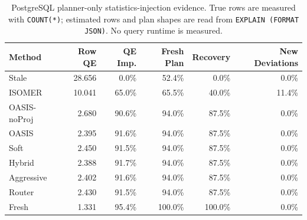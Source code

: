 \begin{table}[t]
  \centering
  \small
  \caption{PostgreSQL planner-only statistics-injection evidence. True rows are measured with \texttt{COUNT(*)}; estimated rows and plan shapes are read from \texttt{EXPLAIN (FORMAT JSON)}. No query runtime is measured.}
  \label{tab:postgres_planner_stats_injection}
  \setlength{\tabcolsep}{4pt}
  \begin{tabular}{lrrrrr}
    \toprule
    Method & Row QE & QE Imp. & Fresh Plan & Recovery & New Deviations \\
    \midrule
    Stale & 28.656 & 0.0\% & 52.4\% & 0.0\% & 0.0\% \\
    ISOMER & 10.041 & 65.0\% & 65.5\% & 40.0\% & 11.4\% \\
    OASIS-noProj & 2.680 & 90.6\% & 94.0\% & 87.5\% & 0.0\% \\
    OASIS & 2.395 & 91.6\% & 94.0\% & 87.5\% & 0.0\% \\
    Soft & 2.450 & 91.5\% & 94.0\% & 87.5\% & 0.0\% \\
    Hybrid & 2.388 & 91.7\% & 94.0\% & 87.5\% & 0.0\% \\
    Aggressive & 2.402 & 91.6\% & 94.0\% & 87.5\% & 0.0\% \\
    Router & 2.430 & 91.5\% & 94.0\% & 87.5\% & 0.0\% \\
    Fresh & 1.331 & 95.4\% & 100.0\% & 100.0\% & 0.0\% \\
    \bottomrule
  \end{tabular}
\end{table}
